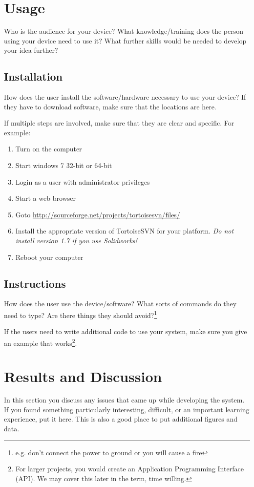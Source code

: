 \documentclass[12pt, svn, draft]{rureport}
\begin{document}
\section{Usage}

Who is the audience for your device?  What knowledge/training does
the person using your device need to use
it?  What further skills would be needed to develop your idea further?

\subsection{Installation}
How does the user install the software/hardware necessary to use your
device?  If they have to download software, make sure that the
locations are here.

If multiple steps are involved, make sure that they are clear and specific.  For example:
\begin{enumerate}
\item Turn on the computer
\item Start windows 7 32-bit or 64-bit
\item Login as a user with administrator privileges
\item Start a web browser
\item Goto \url{http://sourceforge.net/projects/tortoisesvn/files/}
\item Install the appropriate version of TortoiseSVN for your platform.  {\em Do not install version 1.7 if you use Solidworks!}
\item Reboot your computer
\end{enumerate}

\subsection{Instructions}
How does the user use the device/software?  What sorts of commands do
they need to type?  Are there things they should
avoid?\footnote{e.g. don't connect the power to ground or you will
  cause a fire}

If the users need to write additional code to use your system, make
sure you give an example that works\footnote{For larger projects, you
  would create an Application Programming Interface (API).  We may
  cover this later in the term, time willing.}.

\section{Results and Discussion}
In this section you discuss any issues that came up while developing
the system.  If you found something particularly interesting,
difficult, or an important learning experience, put it here.  This is
also a good place to put additional figures and data.
\end{document}
